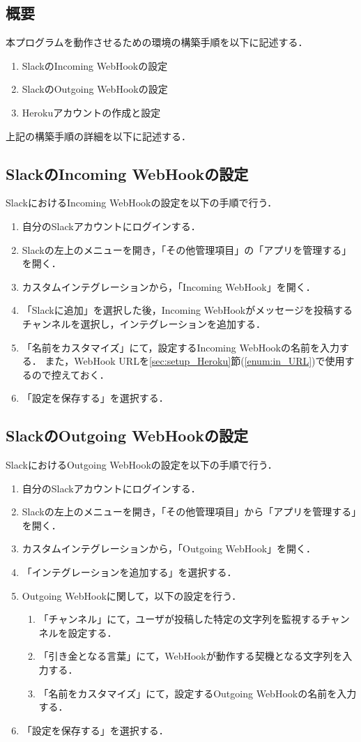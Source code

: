 \documentclass[12pt]{jsarticle}
\begin{document}
\subsection{概要}
本プログラムを動作させるための環境の構築手順を以下に記述する．
\begin{enumerate}
\item SlackのIncoming WebHookの設定
\item SlackのOutgoing WebHookの設定
\item Herokuアカウントの作成と設定
\end{enumerate}

上記の構築手順の詳細を以下に記述する．

\subsection{SlackのIncoming WebHookの設定}\label{sec:Incoming}
SlackにおけるIncoming WebHookの設定を以下の手順で行う．
\begin{enumerate}
\item 自分のSlackアカウントにログインする．
\item Slackの左上のメニューを開き，「その他管理項目」の「アプリを管理する」を開く．
\item カスタムインテグレーションから，「Incoming WebHook」を開く．
\item 「Slackに追加」を選択した後，Incoming WebHookがメッセージを投稿するチャンネルを選択し，インテグレーションを追加する．
\item\label{enum:Heroku_URL} 「名前をカスタマイズ」にて，設定するIncoming WebHookの名前を入力する．
  また，WebHook URLを\ref{sec:setup_Heroku}節(\ref{enum:in_URL})で使用するので控えておく．
\item 「設定を保存する」を選択する．
\end{enumerate}

\subsection{SlackのOutgoing WebHookの設定}
SlackにおけるOutgoing WebHookの設定を以下の手順で行う．
\begin{enumerate}
\item 自分のSlackアカウントにログインする．
\item Slackの左上のメニューを開き，「その他管理項目」から「アプリを管理する」を開く．
\item カスタムインテグレーションから，「Outgoing WebHook」を開く．
\item 「インテグレーションを追加する」を選択する．
\item Outgoing WebHookに関して，以下の設定を行う．
  \begin{enumerate}
  \item 「チャンネル」にて，ユーザが投稿した特定の文字列を監視するチャンネルを設定する．
  \item 「引き金となる言葉」にて，WebHookが動作する契機となる文字列を入力する．
  \item 「名前をカスタマイズ」にて，設定するOutgoing WebHookの名前を入力する．
  \end{enumerate}
\item 「設定を保存する」を選択する．
\end{enumerate}
\end{document}
